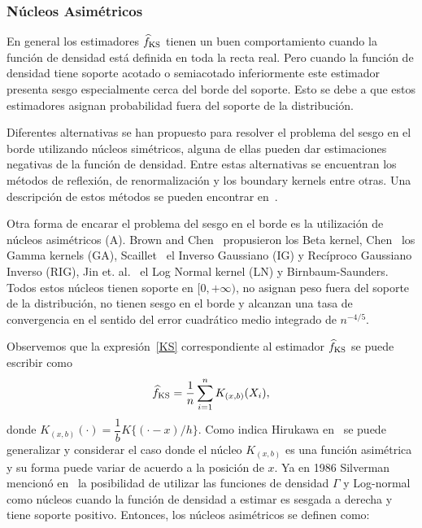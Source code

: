 

\subsubsection{Núcleos Asimétricos}
\label{NucleosAsimetricos}

En general los estimadores $\widehat{f}_{\tiny \text {KS}}$ tienen un buen comportamiento cuando la función de densidad está definida en toda la recta real. Pero cuando la función de densidad tiene soporte acotado o semiacotado inferiormente este estimador presenta sesgo especialmente cerca del borde del soporte. Esto se debe a que estos estimadores asignan probabilidad fuera del soporte de la distribución.

Diferentes alternativas se han propuesto para resolver el problema del sesgo en el borde utilizando núcleos simétricos, alguna de ellas pueden dar estimaciones negativas de la función de densidad. Entre estas alternativas se encuentran los métodos de reflexión, de renormalización y los boundary kernels entre otras. Una descripción de estos métodos se pueden encontrar en~\cite{Jones1993}.


Otra forma de encarar el problema del sesgo en el borde es la utilización de núcleos asimétricos (A). Brown and Chen~\cite{Brown1999,chen1999} propusieron los Beta kernel, Chen~\cite{chensx2000} los Gamma kernels (GA), Scaillet~\cite{Scaillet2004} el Inverso Gaussiano (IG) y Recíproco Gaussiano Inverso (RIG), Jin et. al.~\cite{Jin2003} el Log Normal kernel (LN) y Birnbaum-Saunders. Todos estos núcleos tienen soporte en $[0,+\infty)$, no asignan peso fuera del soporte de la distribución, no tienen sesgo en el borde y alcanzan una tasa de convergencia en el sentido del error cuadrático medio integrado de $n^{-4/5}.$

Observemos que la expresión~\ref{KS} correspondiente al estimador $\widehat{f}_{\tiny \text {KS}}$ se puede escribir como
\begin{align}
\widehat{f}_{\tiny \text {KS}}=\dfrac{1}{n} \sum_{i=1}^n K_{(x,b)} (X_i),
\end{align}
donde $K_{(x,b)}(\cdot) =\dfrac{1}{b} K\{(\cdot-x)/h\}$. Como indica Hirukawa en~\cite{Hirukawa2018} se puede generalizar y considerar el caso donde el núcleo $K_{(x,b)}$ es una función asimétrica y su forma puede variar de acuerdo a la posición de $x$. Ya en 1986 Silverman mencionó en~\cite{Silverman1986} la posibilidad de utilizar las funciones de densidad $\Gamma$ y Log-normal como núcleos cuando la función de densidad a estimar es sesgada a derecha y tiene soporte positivo. Entonces, los núcleos asimétricos se definen como:

